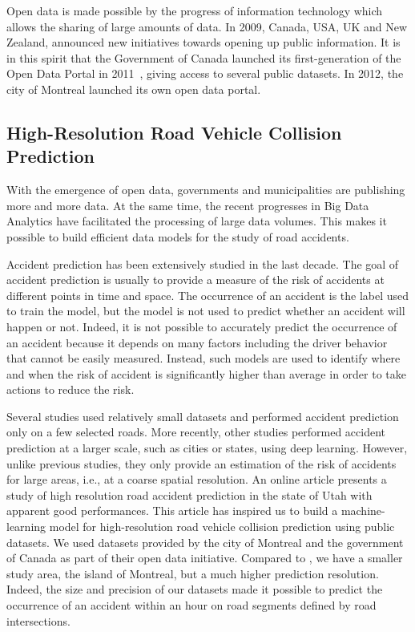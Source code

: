 \documentclass[conference]{IEEEtran}
\begin{document}
Open data is made possible by the progress of information technology which allows the sharing of large amounts of data. In 2009, Canada, USA, UK and New Zealand, announced new initiatives towards opening up public information. It is in this spirit that the Government of Canada launched its first-generation of the Open Data Portal in 2011~\cite{opendata101}, giving access to several public datasets. In 2012, the city of Montreal launched its own open data portal.


\subsection{High-Resolution Road Vehicle Collision Prediction}

With the emergence of open data, governments and municipalities are publishing more and more data. At the same time, the recent progresses in Big Data Analytics have facilitated the processing of large data volumes. This makes it possible to build efficient data models for the study of road accidents.

Accident prediction has been extensively studied in the last decade. 
The goal of accident prediction is usually to provide a measure of the risk of accidents at different points in time and space. The occurrence of an accident is the label used to train the model, but the model is not used to predict whether an accident will happen or not. Indeed, it is not possible to accurately predict the occurrence of an accident because it depends on many factors including the driver behavior that cannot be easily measured. Instead, such models are used to identify where and when the risk of accident is significantly higher than average in order to take actions to reduce the risk.

Several studies used relatively small datasets and performed accident prediction only on a few selected roads\cite{Chang2005, Chang2005b, Lin2015, Theofilatos2017}. More recently, other studies performed accident prediction at a larger scale, such as cities or states, using deep 
learning\cite{QChen2016, Najjar2017, Yuan2018}.
However, unlike previous studies, they only provide an estimation of the risk of accidents for large areas, i.e., at a coarse spatial resolution. An online article\cite{mediumarticle} presents a study of high resolution road accident prediction in the state of Utah with apparent good performances. This article has inspired us to build a machine-learning model for high-resolution road vehicle collision prediction using public datasets. We used datasets provided by the city of Montreal and the government of Canada as part of their open data initiative. Compared to \cite{mediumarticle}, we have a smaller study area, the island of Montreal, but a much higher prediction resolution. Indeed, the size and precision of our datasets made it possible to predict the occurrence of an accident within an hour on road segments defined by road intersections.
\end{document}

